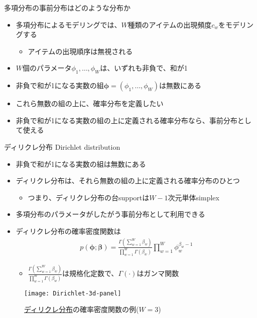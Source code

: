 \documentclass[aspectratio=169,unicode,dvipdfmx,14pt]{beamer}
\begin{document}
\begin{frame}{多項分布の事前分布はどのような分布か}
\begin{itemize}
\item 多項分布によるモデリングでは、$W$種類のアイテムの出現頻度$c_w$をモデリングする
\begin{itemize}
\item アイテムの出現順序は無視される
\end{itemize}
\item $W$個のパラメータ$\phi_1,\ldots,\phi_W$は、いずれも非負で、和が1
\item 非負で和が1になる実数の組$\bm{\phi}=(\phi_1,\ldots,\phi_W)$は無数にある
\item これら無数の組の上に、確率分布を定義したい
\item 非負で和が1になる実数の組の上に定義される確率分布なら、事前分布として使える
\end{itemize}
\end{frame}

\begin{frame}{ディリクレ分布 Dirichlet distribution}
\begin{itemize}
\item 非負で和が1になる実数の組は無数にある
\item ディリクレ分布は、それら無数の組の上に定義される確率分布のひとつ
\begin{itemize}
\item つまり、ディリクレ分布の台supportは$W-1$次元単体simplex
\end{itemize}
\item 多項分布のパラメータがしたがう事前分布として利用できる
\item ディリクレ分布の確率密度関数は
\begin{align}
p(\bm{\phi};\bm{\beta})=\frac{\Gamma(\sum_{w=1}^W \beta_w)}{\prod_{w=1}^W\Gamma(\beta_w)}
\prod_{w=1}^W \phi_w^{\beta_w - 1}
\end{align}
\begin{itemize}
\item $\frac{\Gamma(\sum_{w=1}^W \beta_w)}{\prod_{w=1}^W\Gamma(\beta_w)}$は規格化定数で、$\Gamma(\cdot)$はガンマ関数
\end{itemize}
\end{itemize}
\end{frame}

\begin{frame}
\begin{figure}[htbp]
\begin{center}
\texttt{[image: Dirichlet-3d-panel]}
\caption{\href{https://en.wikipedia.org/wiki/Dirichlet_distribution}{ディリクレ分布}の確率密度関数の例($W=3$)}
\label{}
\end{center}
\end{figure}
\end{frame}
\end{document}
